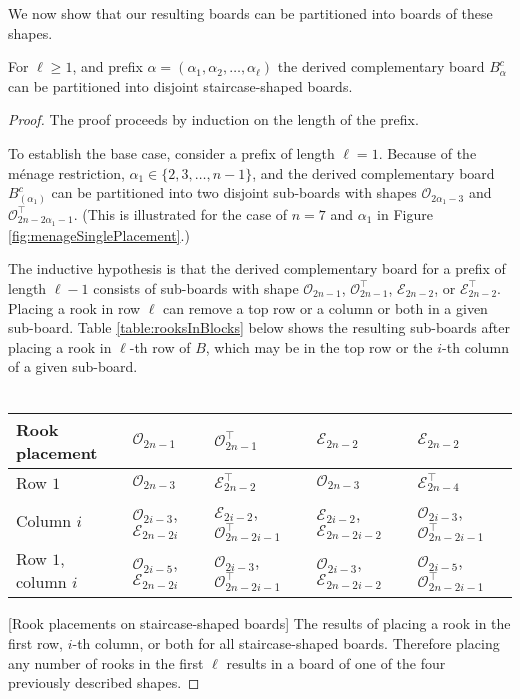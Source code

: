 We now show that our resulting boards can be partitioned into boards of these shapes.

\begin{lemma}
  For $\ell \geq 1$, and prefix $\alpha = (\alpha_1, \alpha_2, \dots, \alpha_\ell)$
  the derived complementary board $B_\alpha^c$ can be partitioned into
  disjoint staircase-shaped boards.
  \label{lemma:boardShape}
\end{lemma}
\begin{proof}
  The proof proceeds by induction on the length of the prefix.

  To establish the base case, consider a prefix of length $\ell = 1$.
  Because of the m\'enage restriction,
  $\alpha_1 \in \{2, 3, \dots, n-1\}$, and
  the derived complementary board $B_{(\alpha_1)}^c$
  can be partitioned into two disjoint sub-boards with shapes
  $\mathcal{O}_{2\alpha_1 - 3}$ and
  $\mathcal{O}^\intercal_{2n - 2\alpha_1 - 1}$.
  (This is illustrated for the case of $n = 7$ and $\alpha_1$ in
  Figure \ref{fig:menageSinglePlacement}.)

  The inductive hypothesis is that the derived complementary board for
  a prefix of length $\ell - 1$ consists of sub-boards with shape
  $\mathcal{O}_{2n - 1}$,
  $\mathcal{O}^\intercal_{2n - 1}$,
  $\mathcal{E}_{2n - 2}$, or
  $\mathcal{E}^\intercal_{2n - 2}$.
  Placing a rook in row $\ell$ can remove a top row or a column or both in a
  given sub-board.
  Table \ref{table:rooksInBlocks} below
  shows the resulting sub-boards after placing a rook in
  $\ell$-th row of $B$,
  which may be in the top row or the $i$-th column of a given sub-board.
  \\ ~ \\
  \captionsetup{type=table}
  \begin{tabular}{|l|l|l|l|l|}
  \hline
  Rook placement
    & $\mathcal{O}_{2n-1}$
    & $\mathcal{O}_{2n-1}^\intercal$
    & $\mathcal{E}_{2n-2}$
    & $\mathcal{E}_{2n-2}$
  \\ \hline
  Row $1$
    & $\mathcal{O}_{2n-3}$
    & $\mathcal{E}_{2n-2}^\intercal$
    & $\mathcal{O}_{2n-3}$
    & $\mathcal{E}_{2n-4}^\intercal$
  \\
  Column $i$
    & $\mathcal{O}_{2i-3}$, $\mathcal{E}_{2n-2i}$
    & $\mathcal{E}_{2i-2}$, $\mathcal{O}_{2n-2i-1}^\intercal$
    & $\mathcal{E}_{2i-2}$, $\mathcal{E}_{2n-2i-2}$
    & $\mathcal{O}_{2i-3}$, $\mathcal{O}_{2n-2i-1}^\intercal$
  \\
  Row $1$, column $i$
    & $\mathcal{O}_{2i-5}$, $\mathcal{E}_{2n-2i}$
    & $\mathcal{O}_{2i-3}$, $\mathcal{O}_{2n-2i-1}^\intercal$
    & $\mathcal{O}_{2i-3}$, $\mathcal{E}_{2n-2i-2}$
    & $\mathcal{O}_{2i-5}$, $\mathcal{O}_{2n-2i-1}^\intercal$
  \\ \hline
  \end{tabular}
  [Rook placements on staircase-shaped boards]{
    The results of placing a rook in the first row, $i$-th column, or both
    for all staircase-shaped boards.
  }
  \label{table:rooksInBlocks}
  Therefore placing any number of rooks in the first $\ell$ results in a board
  of one of the four previously described shapes.
\end{proof}

